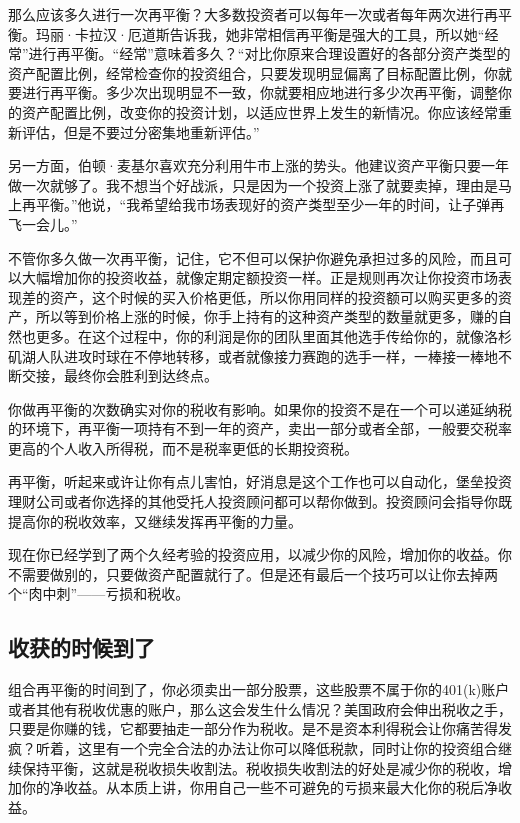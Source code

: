 那么应该多久进行一次再平衡？大多数投资者可以每年一次或者每年两次进行再平衡。玛丽·卡拉汉·厄道斯告诉我，她非常相信再平衡是强大的工具，所以她“经常”进行再平衡。“经常”意味着多久？“对比你原来合理设置好的各部分资产类型的资产配置比例，经常检查你的投资组合，只要发现明显偏离了目标配置比例，你就要进行再平衡。多少次出现明显不一致，你就要相应地进行多少次再平衡，调整你的资产配置比例，改变你的投资计划，以适应世界上发生的新情况。你应该经常重新评估，但是不要过分密集地重新评估。”

另一方面，伯顿·麦基尔喜欢充分利用牛市上涨的势头。他建议资产平衡只要一年做一次就够了。我不想当个好战派，只是因为一个投资上涨了就要卖掉，理由是马上再平衡。”他说，“我希望给我市场表现好的资产类型至少一年的时间，让子弹再飞一会儿。”

不管你多久做一次再平衡，记住，它不但可以保护你避免承担过多的风险，而且可以大幅增加你的投资收益，就像定期定额投资一样。正是规则再次让你投资市场表现差的资产，这个时候的买入价格更低，所以你用同样的投资额可以购买更多的资产，所以等到价格上涨的时候，你手上持有的这种资产类型的数量就更多，赚的自然也更多。在这个过程中，你的利润是你的团队里面其他选手传给你的，就像洛杉矶湖人队进攻时球在不停地转移，或者就像接力赛跑的选手一样，一棒接一棒地不断交接，最终你会胜利到达终点。

你做再平衡的次数确实对你的税收有影响。如果你的投资不是在一个可以递延纳税的环境下，再平衡一项持有不到一年的资产，卖出一部分或者全部，一般要交税率更高的个人收入所得税，而不是税率更低的长期投资税。

再平衡，听起来或许让你有点儿害怕，好消息是这个工作也可以自动化，堡垒投资理财公司或者你选择的其他受托人投资顾问都可以帮你做到。投资顾问会指导你既提高你的税收效率，又继续发挥再平衡的力量。

现在你已经学到了两个久经考验的投资应用，以减少你的风险，增加你的收益。你不需要做别的，只要做资产配置就行了。但是还有最后一个技巧可以让你去掉两个“肉中刺”——亏损和税收。

\subsection{收获的时候到了}

组合再平衡的时间到了，你必须卖出一部分股票，这些股票不属于你的401(k)账户或者其他有税收优惠的账户，那么这会发生什么情况？美国政府会伸出税收之手，只要是你赚的钱，它都要抽走一部分作为税收。是不是资本利得税会让你痛苦得发疯？听着，这里有一个完全合法的办法让你可以降低税款，同时让你的投资组合继续保持平衡，这就是税收损失收割法。税收损失收割法的好处是减少你的税收，增加你的净收益。从本质上讲，你用自己一些不可避免的亏损来最大化你的税后净收益。

